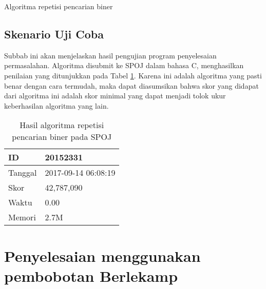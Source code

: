 \begin{algorithm}[h]
\caption{Algoritma repetisi pencarian biner}
\label{alg:repetisi_biner}
\end{algorithm}

\subsection{Skenario Uji Coba}

Subbab ini akan menjelaskan hasil pengujian program penyelesaian permasalahan. Algoritma disubmit ke SPOJ dalam bahasa C, menghasilkan penilaian yang ditunjukkan pada Tabel \ref{tab:score_repetitive}. Karena ini adalah algoritma yang pasti benar dengan cara termudah, maka dapat diasumsikan bahwa skor yang didapat dari algoritma ini adalah skor minimal yang dapat menjadi tolok ukur keberhasilan algoritma yang lain.

\begin{table}[h!]
\caption{Hasil algoritma repetisi pencarian biner pada SPOJ}
\label{tab:score_repetitive}
\begin{center}
\begin{tabular} {|l|l|}
\hline
ID & 20152331 \\ \hline
Tanggal & 2017-09-14 06:08:19 \\ \hline
Skor & 42,787,090 \\ \hline
Waktu & 0.00 \\ \hline
Memori & 2.7M \\ \hline
\end{tabular}
\end{center}
\end{table}


\section{Penyelesaian menggunakan pembobotan Berlekamp}

